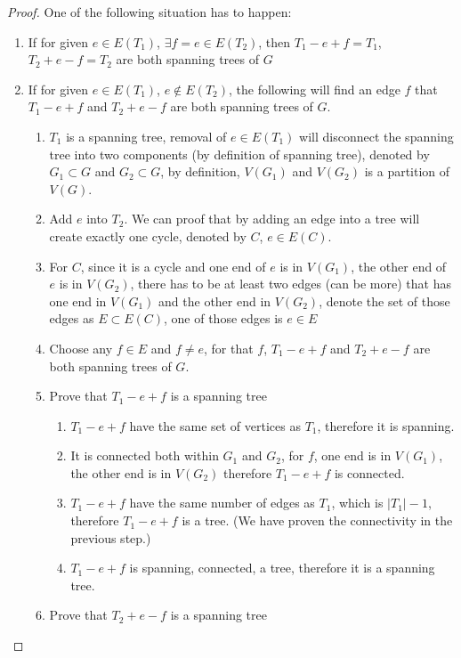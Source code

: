 			\begin{proof}
				One of the following situation has to happen:
				\begin{enumerate}
					\item If for given $e \in E(T_1)$, $\exists f = e \in E(T_2)$, then $T_1 - e + f = T_1$, $T_2 + e - f = T_2$ are both spanning trees of $G$
					\item If for given $e \in E(T_1)$, $e \notin E(T_2)$, the following will find an edge $f$ that $T_1 - e + f$ and $T_2 + e - f$ are both spanning trees of $G$.
					\begin{enumerate}
						\item $T_1$ is a spanning tree, removal of $e \in E(T_1)$ will disconnect the spanning tree into two components (by definition of spanning tree), denoted by $G_1 \subset G$ and $G_2 \subset G$, by definition, $V(G_1)$ and $V(G_2)$ is a partition of $V(G)$.
						\item Add $e$ into $T_2$. We can proof that by adding an edge into a tree will create exactly one cycle, denoted by $C$, $e \in E(C)$.
						\item For $C$, since it is a cycle and one end of $e$ is in $V(G_1)$, the other end of $e$ is in $V(G_2)$, there has to be at least two edges (can be more) that has one end in $V(G_1)$ and the other end in $V(G_2)$, denote the set of those edges as $E \subset E(C)$, one of those edges is $e \in E$
						\item Choose any $f \in E$ and $f \neq e$, for that $f$, $T_1 - e + f$ and $T_2 + e - f$ are both spanning trees of $G$.
						\item Prove that $T_1 - e + f$ is a spanning tree
						\begin{enumerate}
							\item $T_1 - e + f$ have the same set of vertices as $T_1$, therefore it is spanning.
							\item It is connected both within $G_1$ and $G_2$, for $f$, one end is in $V(G_1)$, the other end is in $V(G_2)$ therefore $T_1 - e + f$ is connected.
							\item $T_1 - e + f$ have the same number of edges as $T_1$, which is $|T_1| - 1$, therefore $T_1 - e + f$ is a tree. (We have proven the connectivity in the previous step.)
							\item $T_1 - e + f$ is spanning, connected, a tree, therefore it is a spanning tree.
						\end{enumerate}
						\item Prove that $T_2 + e - f$ is a spanning tree

\end{enumerate}
\end{enumerate}
\end{proof}
